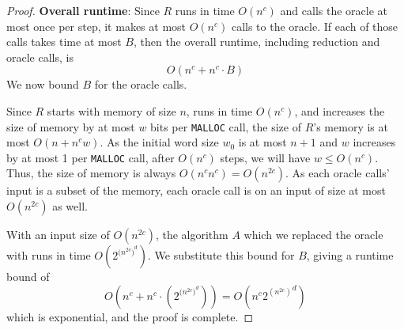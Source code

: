 \documentclass[11pt]{scrartcl}
\theoremstyle{dotlessP}
\theoremstyle{dotlessN}
\begin{document}
\begin{enumerate}[(a)]
\begin{proof}
			\textbf{Overall runtime}: Since $R$ runs in time $O(n^c)$ and calls the oracle at most once per step, it makes at most $O(n^c)$ calls to the oracle. If each of those calls takes time at most $B$, then the overall runtime, including reduction and oracle calls, is
			\[
			O(n^c + n^c \cdot B)
			\] 
			We now bound $B$ for the oracle calls.

			Since $R$ starts with memory of size $n$, runs in time $O(n^c)$, and increases the size of memory by at most $w$ bits per \texttt{MALLOC} call, the size of $R$'s memory is at most $O(n + n^cw)$. As the initial word size $w_0$ is at most $n+1$ and $w$ increases by at most 1 per \texttt{MALLOC} call, after $O(n^c)$ steps, we will have $w \leq O(n^c)$. Thus, the size of memory is always $O(n^cn^c) = O(n^{2c})$. As each oracle calls' input is a subset of the memory, each oracle call is on an input of size at most $O(n^{2c})$ as well.

			With an input size of $O(n^{2c})$, the algorithm $A$ which we replaced the oracle with runs in time $O(2^{({n^{2c})}^d})$. We substitute this bound for $B$, giving a runtime bound of 
			\[
			O(n^c + n^c \cdot (2^{({n^{2c})}^d})) = O(n^c {2^{(n^{2c})}}^d)
			\] 
			which is exponential, and the proof is complete.
		\end{proof}
\end{enumerate}
\end{document}
